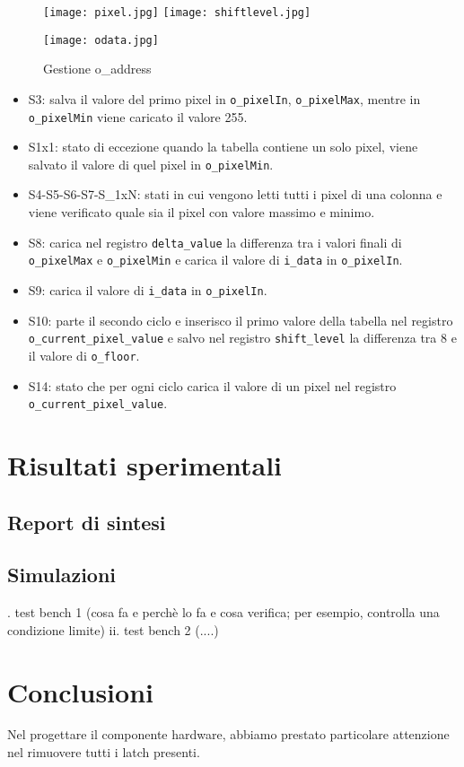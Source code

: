 \documentclass[12pt, table, xcdraw]{article}
\begin{document}
\begin{figure}[h!]
\hspace*{-1.1in}
  \texttt{[image: pixel.jpg]}
 \texttt{[image: shiftlevel.jpg]}

\end{figure}



\begin{figure}[b!]
  \texttt{[image: odata.jpg]}
  \caption{Gestione o\_address}
  \label{fig:boat1}
\end{figure}
\FloatBarrier

\begin{itemize}
\item S3: salva il valore del primo pixel in \texttt{o\_pixelIn}, \texttt{o\_pixelMax}, mentre in \texttt{o\_pixelMin} viene caricato il valore 255.
\item S1x1: stato di eccezione quando la tabella contiene un solo pixel, viene salvato il valore di quel pixel in \texttt{o\_pixelMin}.
\item S4-S5-S6-S7-S\_1xN: stati in cui vengono letti tutti i pixel di una colonna e viene verificato quale sia il pixel con valore massimo e minimo.
\item S8: carica nel registro \texttt{delta\_value} la differenza tra i valori finali di \texttt{o\_pixelMax} e \texttt{o\_pixelMin} e carica il valore di \texttt{i\_data} in \texttt{o\_pixelIn}.
\item S9: carica il valore di \texttt{i\_data} in \texttt{o\_pixelIn}.
\item S10: parte il secondo ciclo e inserisco il primo valore della tabella nel registro \texttt{o\_current\_pixel\_value} e salvo nel registro \texttt{shift\_level}
la differenza tra 8 e il valore di \texttt{o\_floor}.
\item S14: stato che per ogni ciclo carica il valore di un pixel nel registro \texttt{o\_current\_pixel\_value}.
\end{itemize}

\newpage
\section{Risultati sperimentali}
\subsection{Report di sintesi}
\subsection{Simulazioni}
. test bench 1 (cosa fa e perchè lo fa e cosa verifica; per esempio,
controlla una condizione limite)
ii. test bench 2 (....)

\newpage
\section{Conclusioni}
Nel progettare il componente hardware, abbiamo prestato particolare attenzione nel rimuovere tutti i latch presenti.
\end{document}
